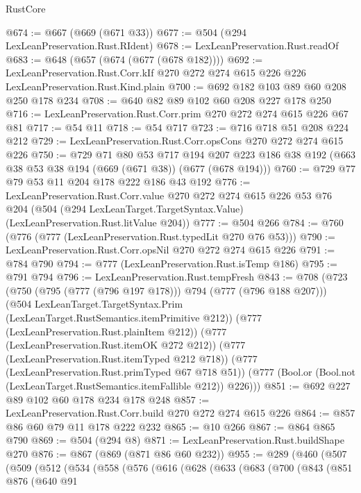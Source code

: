 \begin{lexlean}{RustCore}
\begin{coremodule}
@674 := @667 (@669 (@671 @33))
@677 := @504 (@294 LexLeanPreservation.Rust.RIdent)
@678 := LexLeanPreservation.Rust.readOf
@683 := @648 (@657 (@674 (@677 (@678 @182))))
@692 := LexLeanPreservation.Rust.Corr.kIf
    @270
    @272
    @274
    @615
    @226
    @226
    LexLeanPreservation.Rust.Kind.plain
@700 := @692 @182 @103 @89 @60 @208 @250 @178 @234
@708 := @640 @82 @89 @102 @60 @208 @227 @178 @250
@716 := LexLeanPreservation.Rust.Corr.prim @270 @272 @274 @615 @226 @67 @81
@717 := @54 @11
@718 := @54 @717
@723 := @716 @718 @51 @208 @224 @212
@729 := LexLeanPreservation.Rust.Corr.opsCons @270 @272 @274 @615 @226
@750 := @729
    @71
    @80
    @53
    @717
    @194
    @207
    @223
    @186
    @38
    @192
    (@663 @38 @53 @38 @194 (@669 (@671 @38)) (@677 (@678 @194)))
@760 := @729 @77 @79 @53 @11 @204 @178 @222 @186 @43 @192
@776 := LexLeanPreservation.Rust.Corr.value
    @270
    @272
    @274
    @615
    @226
    @53
    @76
    @204
    (@504 (@294 LexLeanTarget.TargetSyntax.Value) (LexLeanPreservation.Rust.litValue @204))
@777 := @504 @266
@784 := @760 (@776 (@777 (LexLeanPreservation.Rust.typedLit @270 @76 @53)))
@790 := LexLeanPreservation.Rust.Corr.opsNil @270 @272 @274 @615 @226
@791 := @784 @790
@794 := @777 (LexLeanPreservation.Rust.isTemp @186)
@795 := @791 @794
@796 := LexLeanPreservation.Rust.tempFresh
@843 := @708
    (@723
      (@750 (@795 (@777 (@796 @197 @178))) @794 (@777 (@796 @188 @207)))
      (@504 LexLeanTarget.TargetSyntax.Prim (LexLeanTarget.RustSemantics.itemPrimitive @212))
      (@777 (LexLeanPreservation.Rust.plainItem @212))
      (@777 (LexLeanPreservation.Rust.itemOK @272 @212))
      (@777 (LexLeanPreservation.Rust.itemTyped @212 @718))
      (@777 (LexLeanPreservation.Rust.primTyped @67 @718 @51))
      (@777 (Bool.or (Bool.not (LexLeanTarget.RustSemantics.itemFallible @212)) @226)))
@851 := @692 @227 @89 @102 @60 @178 @234 @178 @248
@857 := LexLeanPreservation.Rust.Corr.build @270 @272 @274 @615 @226
@864 := @857 @86 @60 @79 @11 @178 @222 @232
@865 := @10 @266
@867 := @864 @865 @790
@869 := @504 (@294 @8)
@871 := LexLeanPreservation.Rust.buildShape @270
@876 := @867 (@869 (@871 @86 @60 @232))
@955 := @289
    (@460
      (@507
        (@509
          (@512
            (@534
              (@558
                (@576
                  (@616
                    (@628
                      (@633
                        (@683
                          (@700
                            (@843
                              (@851
                                @876
                                (@640
                                  @91

\end{coremodule}
\end{lexlean}

